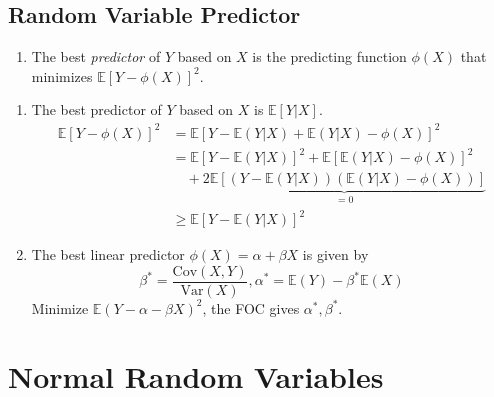 \documentclass[%
 aip,
 jmp,%
 amsmath,amssymb,
 reprint,%
]{revtex4-1}
\newenvironment{note}{\color{gray}\footnotesize}{}
\def\E{\mathbb{E}}
\def\Var{\mathrm{Var}}
\def\Cov{\mathrm{Cov}}
\begin{document}
\subsection{Random Variable Predictor}
\begin{enumerate}
    \item[] The best \emph{predictor} of $Y$ based on $X$ is the predicting
    function $\phi(X)$ that minimizes $\E[Y-\phi(X)]^2$.
\end{enumerate}
\begin{enumerate}
    \item The best predictor of $Y$ based on $X$ is $\E[Y|X]$.\\
        \begin{note}
            \begin{align*}
                \E[Y - \phi(X)]^2 &= \E[Y-\E(Y|X) + \E(Y|X) - \phi(X)]^2 \\
                    &= \E[Y-\E(Y|X)]^2 + \E[\E(Y|X) - \phi(X)]^2 \\
                    &\quad+ \underbrace{2\E[(Y-\E(Y|X))(\E(Y|X) - \phi(X))]}_{=0} \\
                    &\ge \E[Y-\E(Y|X)]^2
            \end{align*}
        \end{note}

    \item The best linear predictor $\phi(X)=\alpha + \beta X$ is given by
      $$ \beta^* = \frac{\Cov(X,Y)}{\Var(X)}, \alpha^* = \E(Y)-\beta^*\E(X) $$
        \begin{note}
            Minimize $\E(Y-\alpha-\beta X)^2$, the FOC gives $\alpha^*, \beta^*$.
        \end{note}
\end{enumerate}



\section{Normal Random Variables}
\end{document}
